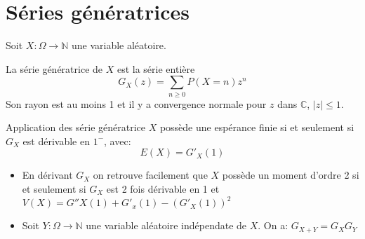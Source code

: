 \documentclass[french, a4paper, 10pt, twocolumn]{article}
\newcommand{\N}{\mathbb{N}}   %
\newcommand{\C}{\mathbb{C}}   %
\begin{document}
\section{Séries génératrices}

\begin{definition}
  Soit \(X: \Omega \rightarrow \N\) une variable aléatoire.

  La série génératrice de \(X\) est la série entière
  \[G_X(z)=\sum_{n\geqslant 0}P(X=n)z^n\]
  Son rayon est au moins 1 et il y a convergence normale pour \(z\) dans \(\C\), \(\lvert z \rvert \leqslant 1\).
\end{definition}

\begin{theoreme}{Application des série génératrice}
  \(X\) possède une espérance finie si et seulement si \(G_X\) est dérivable en \(1^-\), avec:
  \[E(X)=G'_X(1)\]
  \tcblower
  \begin{itemize}
    \item En dérivant \(G_X\) on retrouve facilement que \(X\) possède un moment d'ordre 2 si et seulement si \(G_X\) est
      2 fois dérivable en 1 et \(V(X)=G''X(1)+G'_x(1)-(G'_X(1))^2\)
    \item Soit \(Y: \Omega \rightarrow \N\) une variable aléatoire indépendate de \(X\). On a: \(G_{X+Y}=G_X G_Y\)
  \end{itemize}
\end{theoreme}
\end{document}
